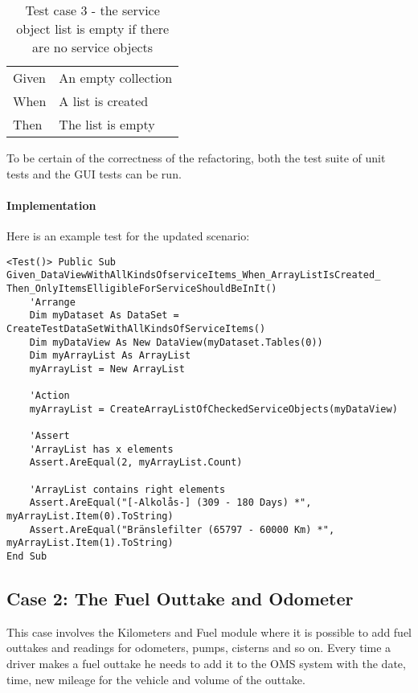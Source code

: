 \documentclass{article}
\begin{document}
				\begin{table}[h!]
					\centering
					\begin{tabular}{|p{1cm} p{7cm} |}
					\hline
					Given 	& An empty collection \\ 
					When 	& A list is created  \\	
					Then 	& The list is empty \\
					\hline
					\end{tabular}
					\caption{Test case 3 - the service object list is empty if there are no service objects}
				\end{table}

				To be certain of the correctness of the refactoring, both the test suite of unit tests and the GUI tests can be run.

				\paragraph{Implementation}
				Here is an example test for the updated scenario:

				\begin{lstlisting}
<Test()> Public Sub Given_DataViewWithAllKindsOfserviceItems_When_ArrayListIsCreated_
Then_OnlyItemsElligibleForServiceShouldBeInIt()
	'Arrange
	Dim myDataset As DataSet = CreateTestDataSetWithAllKindsOfServiceItems()
	Dim myDataView As New DataView(myDataset.Tables(0))
	Dim myArrayList As ArrayList
	myArrayList = New ArrayList

	'Action
	myArrayList = CreateArrayListOfCheckedServiceObjects(myDataView)

	'Assert
	'ArrayList has x elements
	Assert.AreEqual(2, myArrayList.Count)

	'ArrayList contains right elements
	Assert.AreEqual("[-Alkolås-] (309 - 180 Days) *", myArrayList.Item(0).ToString)
	Assert.AreEqual("Bränslefilter (65797 - 60000 Km) *", myArrayList.Item(1).ToString)
End Sub
				\end{lstlisting}

		\subsection{Case 2: The Fuel Outtake and Odometer}

		This case involves the Kilometers and Fuel module where it is possible to add fuel outtakes and readings for odometers, pumps, cisterns and so on. Every time a driver makes a fuel outtake he needs to add it to the OMS system with the date, time, new mileage for the vehicle and volume of the outtake.
\end{document}
